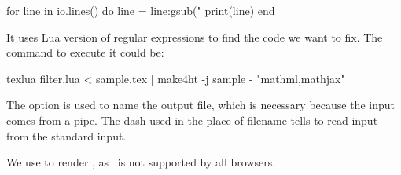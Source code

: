 \begin{luasource}
for line in io.lines() do
  line = line:gsub("%
  print(line)
end
\end{luasource}

It uses Lua version of regular expressions to find the code we want to fix.
The command to execute it could be:

\begin{shellcommand}
texlua filter.lua < sample.tex | make4ht -j sample - "mathml,mathjax"
\end{shellcommand}

The  option is used to name the output file, which is necessary
because the input comes from a pipe. The dash used in the place of filename
tells  to read input from the standard input.

We use  to render \mathml, as \mathml\ is not supported by
all browsers. 
